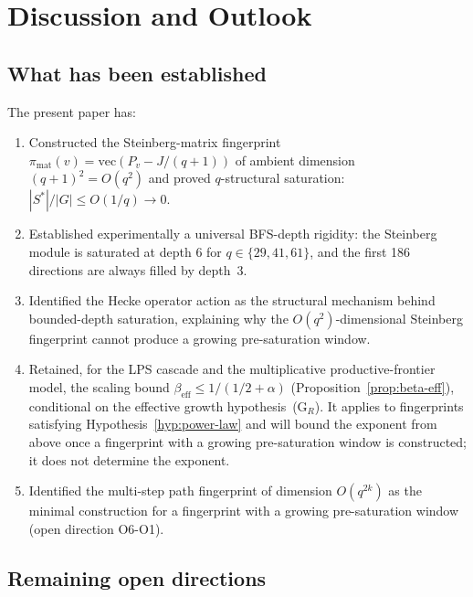 \documentclass[11pt]{article}
\theoremstyle{definition}
\theoremstyle{remark}
\newcommand{\beff}{\beta_{\mathrm{eff}}}
\begin{document}
  \section{Discussion and Outlook}
  \label{sec:discussion}

  \subsection{What has been established}
    \label{ssec:established}

    The present paper has:
    \begin{enumerate}[label=(\arabic*)]
\item Constructed the Steinberg-matrix fingerprint $\pi_{\mathrm{mat}}(v) =
\mathrm{vec}(P_v - J/(q+1))$ of ambient dimension $(q+1)^2 = O(q^2)$ and proved
$q$-structural saturation: $|S^*|/|G| \leq O(1/q) \to 0$.
\item Established experimentally a universal BFS-depth rigidity:
the Steinberg module is saturated at depth 6 for $q \in \{29, 41, 61\}$, and
the first 186 directions are always filled by depth~3.
\item Identified the Hecke operator action as the structural mechanism behind
bounded-depth saturation, explaining why the $O(q^2)$-dimensional Steinberg
fingerprint cannot produce a growing pre-saturation window.
\item Retained, for the LPS cascade and the multiplicative productive-frontier model, the scaling
bound $\beff \leq 1/(1/2 + \alpha)$ (Proposition~\ref{prop:beta-eff}), conditional on the effective
growth hypothesis~(G$_R$).
It applies to fingerprints satisfying Hypothesis~\ref{hyp:power-law} and will bound the exponent from
above once a fingerprint with a growing pre-saturation window is constructed; it does not determine
the exponent.
\item Identified the multi-step path fingerprint of dimension $O(q^{2k})$ as
the minimal construction for a fingerprint with a growing pre-saturation window
(open direction O6-O1).
    \end{enumerate}

  \subsection{Remaining open directions}
    \label{ssec:open}
\end{document}
